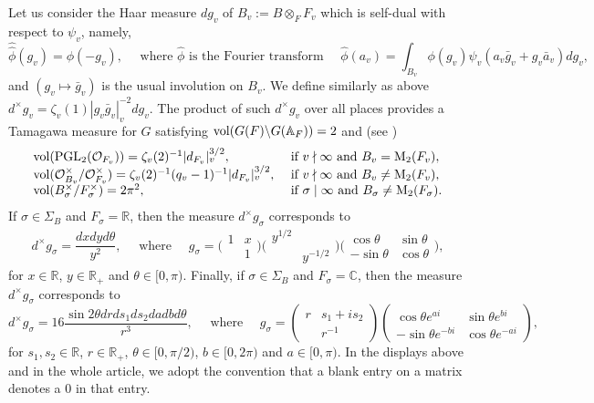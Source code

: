 \documentclass{amsart}
\theoremstyle{definition}
\theoremstyle{remark}
\numberwithin{equation}{section}
\newcommand{\M}{\mathrm{M}}
\newcommand{\PGL}{{\mathrm{PGL}}}
\newcommand{\A}{{\mathbb A}}
\newcommand{\C}{{\mathbb C}}
\newcommand{\R}{{\mathbb R}}
\newcommand{\cO}{{\mathcal O}}
\begin{document}
Let us consider the Haar measure $dg_v$ of $B_v:=B\otimes_F F_v$ which is self-dual with respect to $\psi_v$, namely,
\[
\hat{\hat\phi}(g_v)=\phi(-g_v),\quad\mbox{ where $\hat\phi$ is the Fourier transform }\quad\hat\phi(a_v)=\int_{B_v}\phi(g_v)\psi_v(a_v\bar g_v+g_v\bar a_v)dg_v,
\]
and $(g_v\mapsto\bar g_v)$ is the usual involution on $B_v$. We define similarly as above
$d^\times g_v=\zeta_v(1)|g_v\bar g_v|_v^{-2}dg_v$. The product of such $d^\times g_v$ over all places provides a Tamagawa measure for $G$ satisfying ${\rm vol}(G(F)\backslash G(\A_F))=2$ and (see \cite[Lemma 3.5]{CST})
\[
\begin{array}{ll}
   {\rm vol}(\PGL_2(\cO_{F_v}))=\zeta_v(2)^{-1}|d_{F_v}|_v^{3/2},  &\text{ if }v\nmid\infty\text{ and } B_v=\M_2(F_v),  \\
   {\rm vol}(\cO_{B_v}^\times/\cO_{F_v}^\times)=\zeta_v(2)^{-1}(q_v-1)^{-1}|d_{F_v}|_v^{3/2},  & \text{ if }v\nmid\infty \text{ and } B_v\neq\M_2(F_v),\\
   {\rm vol}(B_\sigma^\times/F_\sigma^\times)=2\pi^2,&\text{ if }\sigma\mid\infty\text{ and } B_\sigma\neq\M_2(F_\sigma).
\end{array}
\]
If $\sigma\in\Sigma_B$ and $F_\sigma=\R$, then the measure $d^\times g_\sigma$ corresponds to 
\begin{equation}\label{Haararch}
d^\times g_\sigma=\frac{dxdyd\theta}{y^2},\quad\text{ where }\quad g_\sigma=\big(\begin{smallmatrix}1&x\\&1\end{smallmatrix}\big) \big(\begin{smallmatrix}y^{1/2}&\\&y^{-1/2}\end{smallmatrix}\big)\big(\begin{smallmatrix}\cos\theta&\sin\theta\\-\sin\theta&\cos\theta\end{smallmatrix}\big),    
\end{equation}
for $x\in \R$, $y\in \R_+$ and $\theta\in [0,\pi)$. Finally, if $\sigma\in\Sigma_B$ and $F_\sigma=\C$, then the measure $d^\times g_\sigma$ corresponds to 
\begin{equation}\label{Haararch2}
d^\times g_\sigma=16\frac{\sin2\theta drds_1ds_2dadbd\theta}{r^3},\quad\text{ where }\quad g_\sigma=\left(\begin{smallmatrix}r&s_1+is_2\\&r^{-1}\end{smallmatrix}\right)\left(\begin{smallmatrix}\cos\theta e^{ai}&\sin\theta e^{bi}\\-\sin\theta e^{-bi}&\cos\theta e^{-ai}\end{smallmatrix}\right),
\end{equation}
for $s_1,s_2\in \R$, $r\in \R_+$, $\theta\in [0,\pi/2)$,  $b\in[0,2\pi)$ and $a\in[0,\pi)$.
In the displays above and in the whole article, we adopt the convention that a blank entry on a matrix denotes a 0 in that entry.
\end{document}
